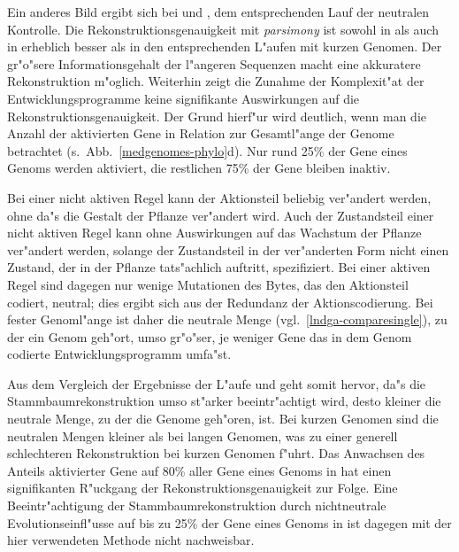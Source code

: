 Ein anderes Bild ergibt sich bei  und , dem entsprechenden Lauf der
neutralen Kontrolle. Die Rekonstruktionsgenauigkeit mit \textsl{parsimony} ist sowohl in 
als auch in  erheblich besser als in den entsprechenden L"aufen mit kurzen Genomen.
Der gr"o"sere Informationsgehalt der l"angeren Sequenzen macht eine akkuratere Rekonstruktion m"oglich.
Weiterhin zeigt die Zunahme der Komplexit"at der Entwicklungsprogramme
keine signifikante Auswirkungen auf die Rekonstruktionsgenauigkeit. Der Grund hierf"ur wird deutlich, wenn man
die Anzahl der aktivierten Gene in Relation zur Gesamtl"ange der Genome betrachtet (s.\ Abb.\ \ref{medgenomes-phylo}d).
Nur rund 25\% der Gene eines Genoms werden aktiviert, die restlichen
75\% der Gene bleiben inaktiv.

Bei einer nicht aktiven Regel kann der
Aktionsteil beliebig ver"andert werden, ohne da"s die Gestalt der Pflanze ver"andert wird. Auch der Zustandsteil
einer nicht aktiven Regel kann ohne Auswirkungen auf das Wachstum der Pflanze ver"andert werden, solange der Zustandsteil
in der ver"anderten Form nicht einen Zustand, der in der Pflanze tats"achlich auftritt, spezifiziert. Bei einer aktiven
Regel sind dagegen nur wenige Mutationen des Bytes, das den Aktionsteil codiert, neutral; dies ergibt sich aus der
Redundanz der Aktionscodierung. Bei fester Genoml"ange ist daher die neutrale Menge (vgl.\ \ref{lndga-comparesingle}),
zu der ein Genom geh"ort, umso gr"o"ser, je weniger Gene das in dem Genom codierte Entwicklungsprogramm umfa"st.

Aus dem Vergleich der Ergebnisse der L"aufe  und  geht somit hervor,
da"s die Stammbaumrekonstruktion umso st"arker beeintr"achtigt wird, desto kleiner die neutrale Menge,
zu der die Genome geh"oren,
ist. Bei kurzen Genomen sind die neutralen Mengen kleiner als bei langen Genomen, was zu einer generell schlechteren
Rekonstruktion bei kurzen Genomen f"uhrt. Das Anwachsen des Anteils aktivierter Gene auf 80\% aller Gene eines Genoms
in  hat einen signifikanten R"uckgang der Rekonstruktionsgenauigkeit zur Folge. Eine Beeintr"achtigung
der Stammbaumrekonstruktion durch nichtneutrale Evolutionseinfl"usse auf bis zu 25\% der Gene eines Genoms in
 ist dagegen mit der hier verwendeten Methode nicht nachweisbar.

